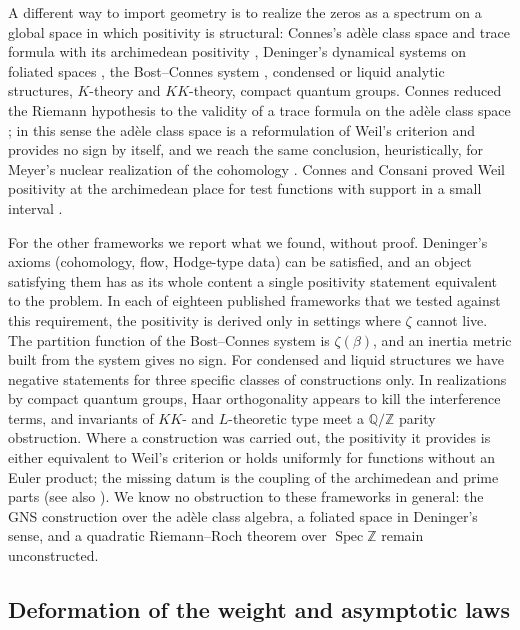 \documentclass[11pt]{amsart}
\theoremstyle{definition}
\theoremstyle{remark}
\numberwithin{equation}{section}
\newcommand{\Z}{\mathbb{Z}}
\newcommand{\Q}{\mathbb{Q}}
\begin{document}
\label{w7:fam:R23}
A different way to import geometry is to realize the zeros as a spectrum on a global space in which positivity
is structural: Connes's ad\`ele class space and trace formula \cite{Connes1999} with its archimedean positivity
\cite{ConnesConsani2021}, Deninger's dynamical systems on foliated spaces \cite{Deninger1998}, the Bost--Connes
system \cite{BostConnes1995}, condensed or liquid analytic structures, $K$-theory and $KK$-theory, compact
quantum groups. Connes reduced the Riemann hypothesis to the validity of a trace formula on the ad\`ele class
space \cite{Connes1999}; in this sense the ad\`ele class space is a reformulation of Weil's criterion and
provides no sign by itself, and we reach the same conclusion, heuristically, for Meyer's nuclear realization of
the cohomology \cite{Meyer2005}. Connes and Consani proved Weil positivity at the archimedean place for test
functions with support in a small interval \cite{ConnesConsani2021}.

For the other frameworks we report what we found, without proof. Deninger's axioms (cohomology, flow, Hodge-type
data) can be satisfied, and an object satisfying them has as its whole content a single positivity statement
equivalent to the problem. In each of eighteen published frameworks that we tested against this requirement, the
positivity is derived only in settings where $\zeta$ cannot live. The partition function of the Bost--Connes
system is $\zeta(\beta)$, and an inertia metric built from the system gives no sign. For condensed and liquid
structures we have negative statements for three specific classes of constructions only. In realizations by
compact quantum groups, Haar orthogonality appears to kill the interference terms, and invariants of $KK$- and
$L$-theoretic type meet a $\Q/\Z$ parity obstruction. Where a construction was carried out, the positivity it
provides is either equivalent to Weil's criterion or holds uniformly for functions without an Euler product; the
missing datum is the coupling of the archimedean and prime parts (see also \cite{P42}). We know no obstruction
to these frameworks in general: the GNS construction over the ad\`ele class algebra, a foliated space in
Deninger's sense, and a quadratic Riemann--Roch theorem over $\operatorname{Spec}\Z$ remain unconstructed.

\subsection{Deformation of the weight and asymptotic laws}\label{w8:sec:families}\label{w8:fam:R24}
\end{document}
